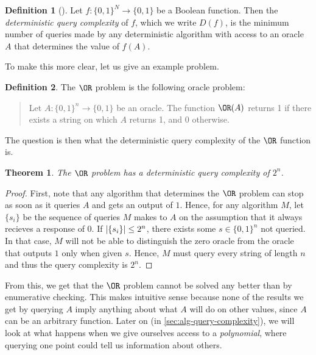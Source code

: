 \documentclass[english]{reedthesis}
\theoremstyle{plain}
\newtheorem{thm}{Theorem}[section]
\theoremstyle{definition}
\newtheorem{defn}[defn]{Definition}
\theoremstyle{remark}
\DeclarePairedDelimiter{\abs}{\lvert}{\rvert}
\begin{document}
\begin{defn}[{\cite[17]{AW09}}]\label{def:det-qc}
  Let $f: \{0, 1\}^{N} \rightarrow \{0, 1\}$ be a Boolean function. Then the
  \emph{deterministic query complexity} of $f$, which we write $D(f)$, is the
  minimum number of queries made by any deterministic algorithm with access to
  an oracle $A$ that determines the value of $f(A)$.
\end{defn}

To make this more clear, let us give an example problem.

\begin{defn}\label{def:or-problem}
  The $\OR$ problem is the following oracle problem:
  \begin{quote}
    Let $A: \{0, 1\}^{n} \rightarrow \{0, 1\}$ be an oracle. The function $\OR(A)$ returns
    1 if there exists a string on which $A$ returns 1, and $0$ otherwise.
  \end{quote}
\end{defn}

The question is then what the deterministic query complexity of the $\OR$
function is.

\begin{thm}
  The $\OR$ problem has a deterministic query complexity of $2^{n}$.
\end{thm}

\begin{proof}
  First, note that any algorithm that determines the $\OR$ problem can stop as
  soon as it queries $A$ and gets an output of $1$. Hence, for any algorithm
  $M$, let $\{s_{i}\}$ be the sequence of queries $M$ makes to $A$ on the
  assumption that it always recieves a response of $0$. If
  $\abs{\{s_{i}\}} \le 2^{n}$, there exists some $s \in \{0, 1\}^{n}$ not queried.
  In that case, $M$ will not be able to distinguish the zero oracle from the
  oracle that outputs $1$ only when given $s$. Hence, $M$ must query every
  string of length $n$ and thus the query complexity is $2^{n}$.
\end{proof}

From this, we get that the $\OR$ problem cannot be solved any better than by
enumerative checking. This makes intuitive sense because none of the results we
get by querying $A$ imply anything about what $A$ will do on other values, since
$A$ can be an arbitrary function. Later on (in \cref{sec:alg-query-complexity}),
we will look at what happens when we give ourselves access to a
\emph{polynomial}, where querying one point could tell us information about
others.
\end{document}
